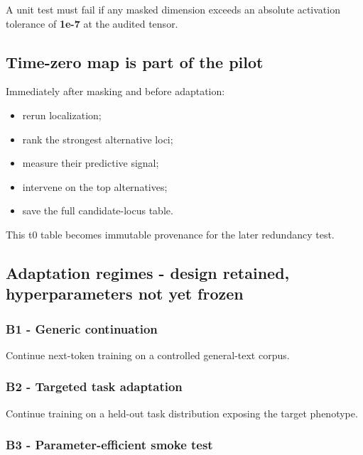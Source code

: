 A unit test must fail if any masked dimension exceeds an absolute activation tolerance of \textbf{1e-7} at the audited tensor.

\subsection{Time-zero map is part of the pilot}\label{time-zero-map-is-part-of-the-pilot}

Immediately after masking and before adaptation:

\begin{itemize}
\tightlist
\item
  rerun localization;
\item
  rank the strongest alternative loci;
\item
  measure their predictive signal;
\item
  intervene on the top alternatives;
\item
  save the full candidate-locus table.
\end{itemize}

This t0 table becomes immutable provenance for the later redundancy test.

\subsection{Adaptation regimes - design retained, hyperparameters not yet frozen}\label{adaptation-regimes---design-retained-hyperparameters-not-yet-frozen}

\subsubsection{B1 - Generic continuation}\label{b1---generic-continuation}

Continue next-token training on a controlled general-text corpus.

\subsubsection{B2 - Targeted task adaptation}\label{b2---targeted-task-adaptation}

Continue training on a held-out task distribution exposing the target phenotype.

\subsubsection{B3 - Parameter-efficient smoke test}\label{b3---parameter-efficient-smoke-test}

